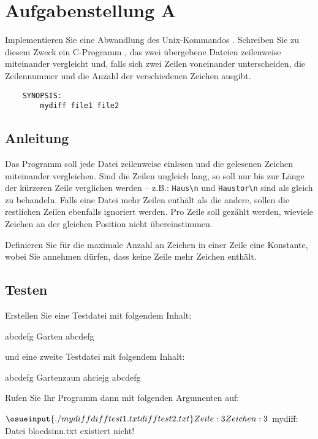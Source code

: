 




\section*{Aufgabenstellung A}
Implementieren Sie eine Abwandlung des Unix-Kommandos .
Schreiben Sie zu diesem Zweck ein C-Programm
, das zwei übergebene Dateien zeilenweise
miteinander vergleicht und, falls sich zwei Zeilen voneinander
unterscheiden, die Zeilennummer und die Anzahl der
verschiedenen Zeichen ausgibt.

\begin{verbatim}
    SYNOPSIS:
        mydiff file1 file2
\end{verbatim}

\subsection*{Anleitung}
      Das Programm soll jede Datei zeilenweise einlesen und die
      gelesenen Zeichen miteinander vergleichen. Sind die Zeilen
      ungleich lang, so soll nur bis zur Länge der kürzeren Zeile
      verglichen werden -- z.B.: \verb+Haus\n+ und \verb+Haustor\n+
      sind als gleich zu behandeln. Falls eine Datei mehr Zeilen enthält
      als die andere, sollen die restlichen Zeilen ebenfalls ignoriert
      werden. Pro Zeile soll gezählt werden, wieviele Zeichen an der
      gleichen Position nicht übereinstimmen.

      Definieren Sie für die maximale Anzahl an Zeichen in einer
      Zeile eine Konstante, wobei Sie annehmen dürfen, dass keine
      Zeile mehr Zeichen enthält.

\subsection*{Testen}

Erstellen Sie eine Testdatei  mit folgendem Inhalt:

\begin{osuefmtcode}
      abcdefg
      Garten
      abcdefg
\end{osuefmtcode}

und eine zweite Testdatei  mit folgendem Inhalt:

\begin{osuefmtcode}
      abcdefg
      Gartenzaun
      ahciejg
      abcdefg
\end{osuefmtcode}

Rufen Sie Ihr Programm dann mit folgenden Argumenten auf:

\begin{osuefmtcode}
    $ \osueinput{./mydiff difftest1.txt difftest2.txt}
    Zeile: 3 Zeichen: 3
    $ 
    mydiff: Datei bloedsinn.txt existiert nicht!
\end{osuefmtcode}

\osueguidelinesone


